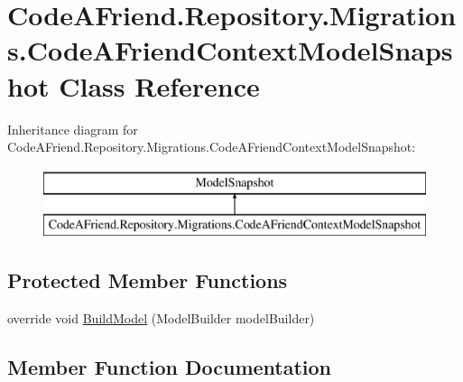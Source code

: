 \hypertarget{class_code_a_friend_1_1_repository_1_1_migrations_1_1_code_a_friend_context_model_snapshot}{}\section{Code\+A\+Friend.\+Repository.\+Migrations.\+Code\+A\+Friend\+Context\+Model\+Snapshot Class Reference}
\label{class_code_a_friend_1_1_repository_1_1_migrations_1_1_code_a_friend_context_model_snapshot}
Inheritance diagram for Code\+A\+Friend.\+Repository.\+Migrations.\+Code\+A\+Friend\+Context\+Model\+Snapshot\+:\begin{figure}[H]
\begin{center}
\leavevmode
\includegraphics[height=2.000000cm]{class_code_a_friend_1_1_repository_1_1_migrations_1_1_code_a_friend_context_model_snapshot}
\end{center}
\end{figure}
\subsection*{Protected Member Functions}
\begin{DoxyCompactItemize}
\item 
override void \mbox{\hyperlink{class_code_a_friend_1_1_repository_1_1_migrations_1_1_code_a_friend_context_model_snapshot_a1155a6c780f4d8fc273bb168999f8cd6}{Build\+Model}} (Model\+Builder model\+Builder)
\end{DoxyCompactItemize}


\subsection{Member Function Documentation}
\mbox{\label{class_code_a_friend_1_1_repository_1_1_migrations_1_1_code_a_friend_context_model_snapshot_a1155a6c780f4d8fc273bb168999f8cd6}} 
